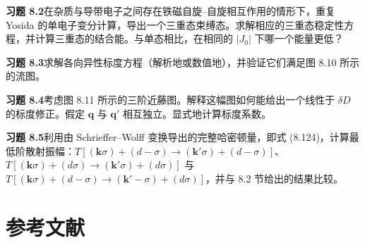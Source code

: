 \textbf{习题 8.2}\quad 在杂质与导带电子之间存在铁磁自旋--自旋相互作用的情形下，重复 Yosida 的单电子变分计算，导出一个三重态束缚态。求解相应的三重态稳定性方程，并计算三重态的结合能。与单态相比，在相同的 $|J_{0}|$ 下哪一个能量更低？

\textbf{习题 8.3}\quad 求解各向异性标度方程（解析地或数值地），并验证它们满足图 8.10 所示的流图。

\textbf{习题 8.4}\quad 考虑图 8.11 所示的三阶近藤图。解释这幅图如何能给出一个线性于 $\delta D$ 的标度修正。假定 $\mathbf{q}$ 与 $\mathbf{q}'$ 相互独立。显式地计算标度系数。

\textbf{习题 8.5}\quad 利用由 Schrieffer--Wolff 变换导出的完整哈密顿量，即式 (8.124)，计算最低阶散射振幅：$T[(\mathbf{k}\sigma)+(d-\sigma) \to (\mathbf{k}'\sigma)+(d-\sigma)]$、$T[(\mathbf{k}\sigma)+(d\sigma) \to (\mathbf{k}'\sigma)+(d\sigma)]$ 与 $T[(\mathbf{k}\sigma)+(d-\sigma) \to (\mathbf{k}'-\sigma)+(d\sigma)]$，并与 8.2 节给出的结果比较。

\section*{参考文献}

